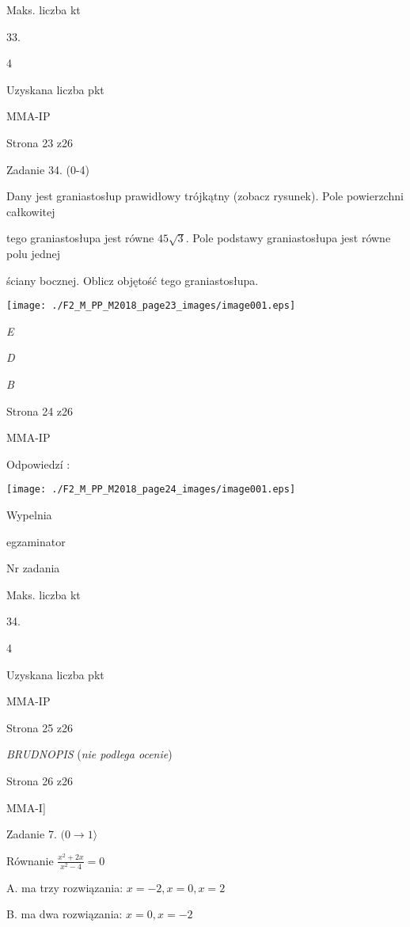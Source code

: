\documentclass[a4paper,12pt]{article}
\begin{document}
Maks. liczba kt

33.

4

Uzyskana liczba pkt

MMA-IP

Strona 23 z26





Zadanie 34. (0-4)

Dany jest graniastosłup prawidłowy trójkątny (zobacz rysunek). Pole powierzchni całkowitej

tego graniastosłupa jest równe $45\sqrt{3}$. Pole podstawy graniastosłupa jest równe polu jednej

ściany bocznej. Oblicz objętość tego graniastosłupa.
\begin{center}
\texttt{[image: ./F2\_M\_PP\_M2018\_page23\_images/image001.eps]}
\end{center}
{\it E}

{\it D}

{\it B}

Strona 24 z26

MMA-IP





Odpowiedzí :
\begin{center}
\texttt{[image: ./F2\_M\_PP\_M2018\_page24\_images/image001.eps]}
\end{center}
Wypelnia

egzaminator

Nr zadania

Maks. liczba kt

34.

4

Uzyskana liczba pkt

MMA-IP

Strona 25 z26





{\it BRUDNOPIS} ({\it nie podlega ocenie})

Strona 26 z26

MMA-I]





Zadanie 7. $(0\rightarrow 1\rangle$

Równanie $\displaystyle \frac{x^{2}+2x}{x^{2}-4}=0$

A. ma trzy rozwiązania: $x=-2, x=0, x=2$

B. ma dwa rozwiązania: $x=0, x=-2$
\end{document}
